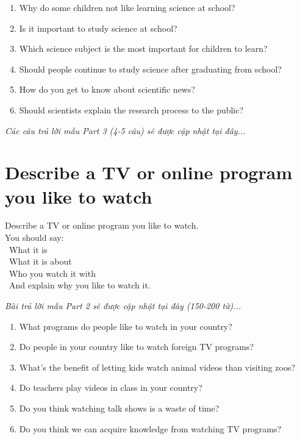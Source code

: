 \begin{ieltsprompt}
\begin{enumerate}[itemsep=4pt]
    \item Why do some children not like learning science at school?
    \item Is it important to study science at school?
    \item Which science subject is the most important for children to learn?
    \item Should people continue to study science after graduating from school?
    \item How do you get to know about scientific news?
    \item Should scientists explain the research process to the public?
\end{enumerate}
\end{ieltsprompt}

\vspace{1em}
\textit{Các câu trả lời mẫu Part 3 (4-5 câu) sẽ được cập nhật tại đây...}
\vspace{2em}

\section{Describe a TV or online program you like to watch}
\begin{ieltsprompt}
Describe a TV or online program you like to watch. \\
You should say: \\
\textbullet\ What it is \\
\textbullet\ What it is about \\
\textbullet\ Who you watch it with \\
\textbullet\ And explain why you like to watch it. \\
\end{ieltsprompt}

\vspace{1em}
\textit{Bài trả lời mẫu Part 2 sẽ được cập nhật tại đây (150-200 từ)...}
\vspace{2em}

\begin{ieltsprompt}
\begin{enumerate}[itemsep=4pt]
    \item What programs do people like to watch in your country?
    \item Do people in your country like to watch foreign TV programs?
    \item What's the benefit of letting kids watch animal videos than visiting zoos?
    \item Do teachers play videos in class in your country?
    \item Do you think watching talk shows is a waste of time?
    \item Do you think we can acquire knowledge from watching TV programs?
\end{enumerate}
\end{ieltsprompt}

